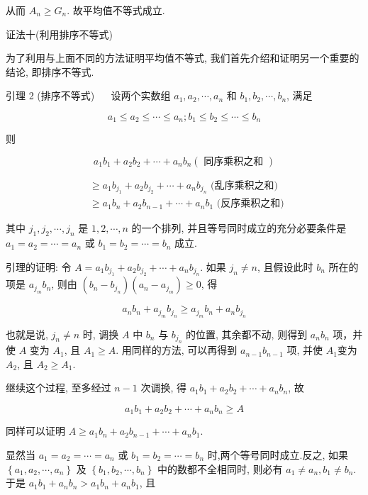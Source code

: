 从而 $A_{n} \geqslant G_{n}$. 故平均值不等式成立.

证法十(利用排序不等式)

为了利用与上面不同的方法证明平均值不等式, 我们首先介绍和证明另一个重要的结论, 即排序不等式.

引理 2 (排序不等式) $\quad$ 设两个实数组 $a_{1}, a_{2}, \cdots, a_{n}$ 和 $b_{1}, b_{2}, \cdots, b_{n}$, 满足

$$
a_{1} \leqslant a_{2} \leqslant \cdots \leqslant a_{n} ; b_{1} \leqslant b_{2} \leqslant \cdots \leqslant b_{n}
$$

则

$$
a_{1} b_{1}+a_{2} b_{2}+\cdots+a_{n} b_{n}(\text { 同序乘积之和 })
$$

$$
\begin{aligned}
& \geqslant a_{1} b_{j_{1}}+a_{2} b_{j_{2}}+\cdots+a_{n} b_{j_{n}} \text { (乱序乘积之和) } \\
& \geqslant a_{1} b_{n}+a_{2} b_{n-1}+\cdots+a_{n} b_{1} \text { (反序乘积之和) }
\end{aligned}
$$

其中 $j_{1}, j_{2}, \cdots, j_{n}$ 是 $1,2, \cdots, n$ 的一个排列, 并且等号同时成立的充分必要条件是 $a_{1}=a_{2}=\cdots=a_{n}$ 或 $b_{1}=b_{2}=\cdots=b_{n}$ 成立.

引理的证明: 令 $A=a_{1} b_{j_{1}}+a_{2} b_{j_{2}}+\cdots+a_{n} b_{j_{n}}$. 如果 $j_{n} \neq n$, 且假设此时 $b_{n}$ 所在的项是 $a_{j_{m}} b_{n}$, 则由 $\left(b_{n}-b_{j_{n}}\right)\left(a_{n}-a_{j_{m}}\right) \geqslant 0$, 得

$$
a_{n} b_{n}+a_{j_{m}} b_{j_{n}} \geqslant a_{j_{m}} b_{n}+a_{n} b_{j_{n}}
$$

也就是说, $j_{n} \neq n$ 时, 调换 $A$ 中 $b_{n}$ 与 $b_{j_{n}}$ 的位置, 其余都不动, 则得到 $a_{n} b_{n}$ 项，并使 $A$ 变为 $A_{1}$, 且 $A_{1} \geqslant A$. 用同样的方法, 可以再得到 $a_{n-1} b_{n-1}$ 项, 并使 $A_{1}$变为 $A_{2}$, 且 $A_{2} \geqslant A_{1}$.

继续这个过程, 至多经过 $n-1$ 次调换, 得 $a_{1} b_{1}+a_{2} b_{2}+\cdots+a_{n} b_{n}$, 故

$$
a_{1} b_{1}+a_{2} b_{2}+\cdots+a_{n} b_{n} \geqslant A
$$

同样可以证明 $A \geqslant a_{1} b_{n}+a_{2} b_{n-1}+\cdots+a_{n} b_{1}$.

显然当 $a_{1}=a_{2}=\cdots=a_{n}$ 或 $b_{1}=b_{2}=\cdots=b_{n}$ 时,两个等号同时成立.反之, 如果 $\left\{a_{1}, a_{2}, \cdots, a_{n}\right\}$ 及 $\left\{b_{1}, b_{2}, \cdots, b_{n}\right\}$ 中的数都不全相同时, 则必有 $a_{1} \neq a_{n}, b_{1} \neq b_{n}$. 于是 $a_{1} b_{1}+a_{n} b_{n}>a_{1} b_{n}+a_{n} b_{1}$, 且

